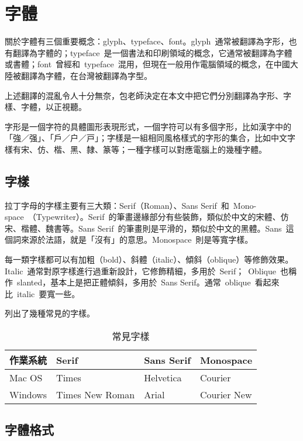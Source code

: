 \chapter{字體}

關於字體有三個重要概念：glyph、typeface、font。glyph~通常被翻譯為字形，也有翻譯為字體的；typeface~是一個書法和印刷領域的概念，它通常被翻譯為字體或書體；font~曾經和~typeface~混用，但現在一般用作電腦領域的概念，在中國大陸被翻譯為字體，在台灣被翻譯為字型。

上述翻譯的混亂令人十分無奈，包老師決定在本文中把它們分別翻譯為字形、字樣、字體，以正視聽。

字形是一個字符的具體圖形表現形式，一個字符可以有多個字形，比如漢字中的「{強／强}」、「{戶／户／戸}」；字樣是一組相同風格樣式的字形的集合，比如中文字樣有宋、仿、楷、黑、隸、篆等；一種字樣可以對應電腦上的幾種字體。

\section{字樣}
\label{sec:typeface}
拉丁字母的字樣主要有三大類：Serif（Roman）、Sans Serif~和~Mono-space~（Typewriter）。Serif~的筆畫邊緣部分有些裝飾，類似於中文的宋體、仿宋、楷體、魏書等。Sans Serif~的筆畫則是平滑的，類似於中文的黑體。Sans~這個詞來源於法語，就是「沒有」的意思。Monospace~則是等寬字樣。

每一類字樣都可以有加粗（bold）、斜體（italic）、傾斜（oblique）等修飾效果。Italic~通常對原字樣進行過重新設計，它修飾精細，多用於~Serif；~Oblique~也稱作~slanted，基本上是把正體傾斜，多用於~Sans Serif。通常~oblique~看起來比~italic~要寬一些。

列出了幾種常見的字樣。

\begin{table}[htbp]
\caption{常見字樣}
\label{tab:typeface}
\centering
\begin{tabular}{llll}
    \toprule
    作業系統 & Serif           & Sans Serif & Monospace \\
    \midrule
    Mac OS   & Times           & Helvetica  & Courier \\
    Windows  & Times New Roman & Arial      & Courier New \\
    \bottomrule
\end{tabular}
\end{table}

\section{字體格式}
\label{sec:font}

